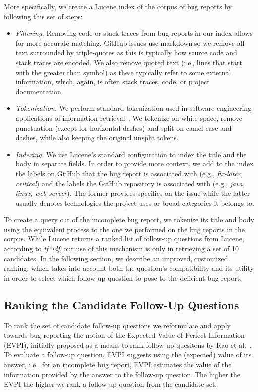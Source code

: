 More specifically, we create a Lucene index of the corpus of bug reports by following this set of steps:
\begin{itemize}
\item {\em Filtering.} Removing code or stack traces from bug reports in our index allows
for more accurate matching. GitHub issues use markdown so we remove all text surrounded
by triple-quotes as this is typically how source code and stack traces are encoded. We also
remove quoted text (i.e., lines that start with the greater than symbol) as these typically
refer to some external information, which, again, is often stack traces, code, or project documentation.
\item {\em Tokenization.} We perform standard tokenization used in software engineering applications
of information retrieval~\cite{marcus2004information,shepherd2012sando}. We tokenize on white space, remove
punctuation (except for horizontal dashes)
and split on camel case and dashes, while also keeping the original unsplit tokens.
\item {\em Indexing.} We use Lucene's standard configuration to index the title and the body in separate fields. In order to provide
more context, we add to the index the labels on GitHub that the bug report is associated with (e.g., {\em fix-later, critical}) and the labels the
GitHub repository is associated with (e.g., {\em java, linux, web-server}). The former provides specifics on the issue while the
latter usually denotes technologies the project uses or broad categories it belongs to.
\end{itemize}

To create a query out of the incomplete bug report, we tokenize its title and body
using the equivalent process to the one we performed on the bug reports in the corpus.
While Lucene returns a ranked list of follow-up questions from Lucene, according to {\em tf*idf}, our
use of this mechanism is only in retrieving a set of 10 candidates. In the following section, we describe
an improved, customized ranking, which takes into account both the question's compatibility and its utility
in order to select which follow-up question to pose to the deficient bug report.


\subsection{Ranking the Candidate Follow-Up Questions}\label{sec:ranking}

To rank the set of candidate follow-up questions we reformulate and apply towards bug reporting
the notion of the Expected Value of Perfect Information (EVPI), initially proposed as a means to
rank follow-up quesitons by Rao et al.~\cite{rao-daume-iii-2018-learning}. To evaluate a follow-up question, EVPI suggests
using the (expected) value of its answer, i.e., for an
incomplete bug report, EVPI estimates the value of the information provided by the answer to the
follow-up question. The higher the EVPI the higher we rank a follow-up question from the candidate
set.

